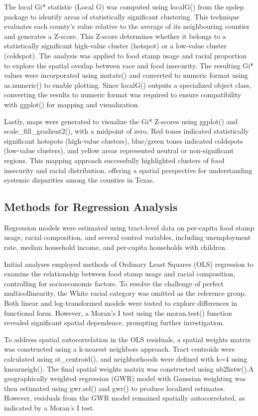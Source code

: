 \documentclass[]{article}
\begin{document}
The local Gi* statistic (Local G) was computed using localG() from the
spdep package to identify areas of statistically significant clustering.
This technique evaluates each county's value relative to the average of
its neighbouring counties and generates a Z-score. This Z-score
determines whether it belongs to a statistically significant high-value
cluster (hotspot) or a low-value cluster (coldspot). The analysis was
applied to food stamp usage and racial proportion to explore the spatial
overlap between race and food insecurity. The resulting Gi* values were
incorporated using mutate() and converted to numeric format using
as.numeric() to enable plotting. Since localG() outputs a specialized
object class, converting the results to numeric format was required to
ensure compatibility with ggplot() for mapping and visualization.

Lastly, maps were generated to visualize the Gi* Z-scores using ggplot()
and scale\_fill\_gradient2(), with a midpoint of zero. Red tones
indicated statistically significant hotspots (high-value clusters),
blue/green tones indicated coldspots (low-value clusters), and yellow
areas represented neutral or non-significant regions. This mapping
approach successfully highlighted clusters of food insecurity and racial
distribution, offering a spatial perspective for understanding systemic
disparities among the counties in Texas.

\subsection{Methods for Regression
Analysis}\label{methods-for-regression-analysis}

Regression models were estimated using tract-level data on per-capita
food stamp usage, racial composition, and several control variables,
including unemployment rate, median household income, and per-capita
households with children.

Initial analyses employed methods of Ordinary Least Squares (OLS)
regression to examine the relationship between food stamp usage and
racial composition, controlling for socioeconomic factors. To resolve
the challenge of perfect multicollinearity, the White racial category
was omitted as the reference group. Both linear and log-transformed
models were tested to explore differences in functional form. However, a
Moran's I test using the moran.test() function revealed significant
spatial dependence, prompting further investigation.

To address spatial autocorrelation in the OLS residuals, a spatial
weights matrix was constructed using a k-nearest neighbors approach.
Tract centroids were calculated using st\_centroid(), and neighborhoods
were defined with k=4 using knearneigh(). The final spatial weights
matrix was constructed using nb2listw().A geographically weighted
regression (GWR) model with Gaussian weighting was then estimated using
gwr.sel() and gwr() to produce localized estimates. However, residuals
from the GWR model remained spatially autocorrelated, as indicated by a
Moran's I test.
\end{document}
